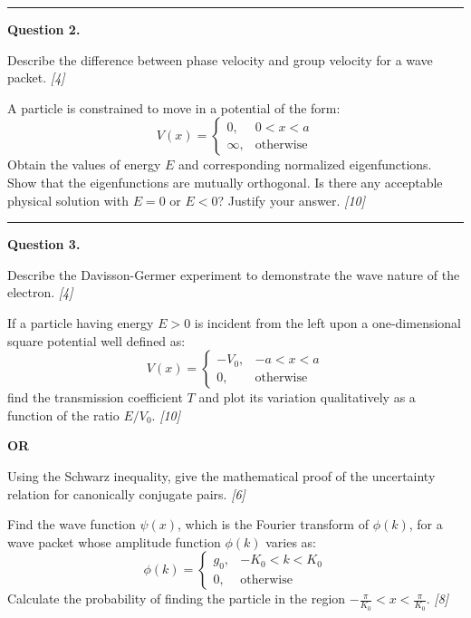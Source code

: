 \documentclass[11pt,a4paper]{article}
\newcommand{\pts}[1]{\hfill   \textit{[#1]}}
\begin{document}
\medskip\rule{\linewidth}{0.2pt}




\noindent   \textbf{Question 2.}

\begin{parts}
  \item Describe the difference between phase velocity and group velocity for a wave packet. \pts{4}
  \item A particle is constrained to move in a potential of the form:
    \[ V(x) = 
\begin{cases} 0, & 0 < x < a \\ \infty, &  \text{otherwise} \end{cases} \]
    Obtain the values of energy $E$ and corresponding normalized eigenfunctions. Show that the eigenfunctions are mutually orthogonal. Is there any acceptable physical solution with $E=0$ or $E<0$? Justify your answer. \pts{10}
\end{parts}

\medskip\rule{\linewidth}{0.2pt}




\noindent   \textbf{Question 3.}

\begin{parts}
  \item Describe the Davisson-Germer experiment to demonstrate the wave nature of the electron. \pts{4}
  \item If a particle having energy $E > 0$ is incident from the left upon a one-dimensional square potential well defined as:
    \[ V(x) = 
\begin{cases} -V_0, & -a < x < a \\ 0, &  \text{otherwise} \end{cases} \]
    find the transmission coefficient $T$ and plot its variation qualitatively as a function of the ratio $E/V_0$. \pts{10}
\end{parts}
\hfill   \textbf{OR}

\begin{parts}
  \item Using the Schwarz inequality, give the mathematical proof of the uncertainty relation for canonically conjugate pairs. \pts{6}
  \item Find the wave function $\psi(x)$, which is the Fourier transform of $\phi(k)$, for a wave packet whose amplitude function $\phi(k)$ varies as:
    \[ \phi(k) = 
\begin{cases} g_0, & -K_0 < k < K_0 \\ 0, &  \text{otherwise} \end{cases} \]
    Calculate the probability of finding the particle in the region $-\frac{\pi}{K_0} < x < \frac{\pi}{K_0}$. \pts{8}
\end{parts}
\end{document}
